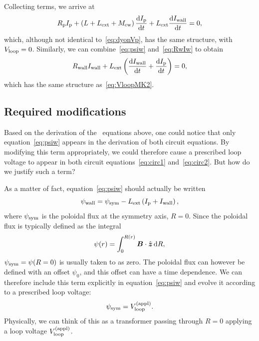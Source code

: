 \documentclass{notes}
\newcommand{\Ip}{I_{\rm p}}
\newcommand{\Iw}{I_{\rm wall}}
\newcommand{\Vl}{V_{\rm loop}}
\newcommand{\Rp}{R_{\rm p}}
\newcommand{\psiw}{\psi_{\rm wall}}
\begin{document}
    Collecting terms, we arrive at
    \begin{equation}\label{eq:circ1}
        \Rp\Ip + \left(L + L_{\rm ext} + M_{\rm ew}\right)\frac{\dd\Ip}{\dd t}
        + L_{\rm ext}\frac{\dd I_{\rm wall}}{\dd t} = 0,
    \end{equation}
    which, although not identical to~\eqref{eq:dyonVp}, has the same structure,
    with $\Vl=0$. Similarly, we can combine~\eqref{eq:psiw} and~\eqref{eq:RwIw}
    to obtain
    \begin{equation}\label{eq:circ2}
        R_{\rm wall}I_{\rm wall} + L_{\rm ext}\left(\frac{\dd I_{\rm wall}}{\dd t} + \frac{\dd\Ip}{\dd t} \right) = 0,
    \end{equation}
    which has the same structure as~\eqref{eq:VloopMK2}.

    \subsection{Required modifications}
    Based on the derivation of the \DYON\ equations above, one could notice that
    only equation~\eqref{eq:psiw} appears in the derivation of both circuit
    equations. By modifying this term appropriately, we could therefore cause a
    prescribed loop voltage to appear in both circuit equations~\eqref{eq:circ1}
    and~\eqref{eq:circ2}. But how do we justify such a term?

    As a matter of fact, equation~\eqref{eq:psiw} should actually be written
    \begin{equation}
        \psiw = \psi_{\rm sym} - L_{\rm ext}\left( \Ip + \Iw \right),
    \end{equation}
    where $\psi_{\rm sym}$ is the poloidal flux at the symmetry axis, $R=0$.
    Since the poloidal flux is typically defined as the integral
    \begin{equation}
        \psi(r) = \int_0^{R(r)} \boldsymbol{B}\cdot\hat{\boldsymbol{z}}\,\mathrm{d} R,
    \end{equation}
    $\psi_{\rm sym}=\psi(R=0)$ is usually taken to as zero. The poloidal flux
    can however be defined with an offset $\psi_0$, and this offset can have
    a time dependence. We can therefore include this term explicitly in
    equation~\eqref{eq:psiw} and evolve it according to a prescribed loop
    voltage:
    \begin{equation}
        \psi_{\rm sym} = \Vl^{(\rm appl)}.
    \end{equation}
    Physically, we can think of this as a transformer passing through $R=0$
    applying a loop voltage $\Vl^{(\rm appl)}$.
\end{document}

